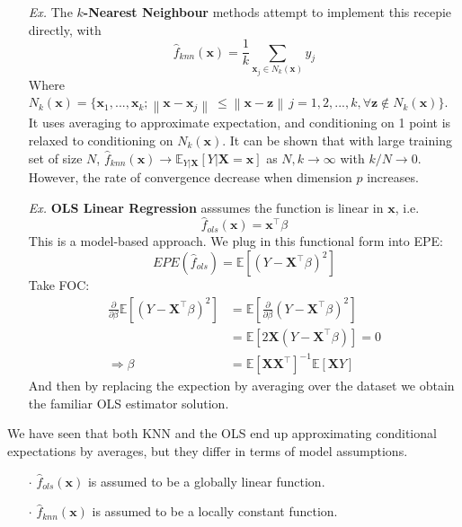 \documentclass[a4paper, 11pt]{article}
\begin{document}
\begin{itemize}
	\item[\textit{Ex.}] The \textbf{$k$-Nearest Neighbour} methods attempt to implement this recepie directly, with
	$$
	\hat{f}_{knn}(\bm{x}) = \frac{1}{k}\sum_{\bm{x}_j \in N_k(\bm{x})} y_j
	$$
	Where $N_k(\bm{x})=\{\bm{x}_1, ..., \bm{x}_{k}; \left\|\bm{x}-\bm{x}_j\right\|\ \leq \left\|\bm{x}-\bm{z}\right\|\, j=1,2,...,k, \forall \bm{z}\notin N_k(\bm{x})\}$. It uses averaging to approximate expectation, and conditioning on 1 point is relaxed to conditioning on $N_k(\bm{x})$. It can be shown that with large training set of size $N$, $\hat{f}_{knn}(\bm{x})\to \mathbb{E}_{Y|\bm{X}}\left[Y|\bm{X}=\bm{x}\right]$ as $N,k\to \infty$ with $k/N \to 0$. However, the rate of convergence decrease when dimension $p$ increases.

	\item[\textit{Ex.}] \textbf{OLS Linear Regression} asssumes the function is linear in $\bm{x}$, i.e.
	$$
	\hat{f}_{ols}(\bm{x}) = \bm{x}^{\top} \beta 
	$$
	This is a model-based approach. We plug in this functional form into EPE:
	\begin{equation}
		EPE(\hat{f}_{ols}) = \mathbb{E}\left[(Y- \bm{X}^{\top}\beta )^2\right]
	\end{equation}
	Take FOC: 
	\begin{equation}
		\begin{split}
			\frac{\partial }{\partial \beta} \mathbb{E}\left[(Y- \bm{X}^{\top}\beta )^2\right] &= \mathbb{E}\left[\frac{\partial }{\partial \beta}(Y- \bm{X}^{\top}\beta )^2\right] \\
			&= \mathbb{E}\left[2 \bm{X}(Y- \bm{X}^{\top}\beta )\right] = 0\\
			\Rightarrow \beta &= \mathbb{E}\left[\bm{X} \bm{X}^{\top}\right]^{-1} \mathbb{E}\left[\bm{X}Y \right]
		\end{split}
	\end{equation}
	And then by replacing the expection by averaging over the dataset we obtain the familiar OLS estimator solution.
\end{itemize}

We have seen that both KNN and the OLS end up approximating conditional expectations by averages, but they differ in terms of model assumptions.
\begin{itemize}
	\item[$\cdot$] $\hat{f}_{ols}(\bm{x})$ is assumed to be a globally linear function.
	\item[$\cdot$] $\hat{f}_{knn}(\bm{x})$ is assumed to be a locally constant function. 
\end{itemize}
\end{document}
